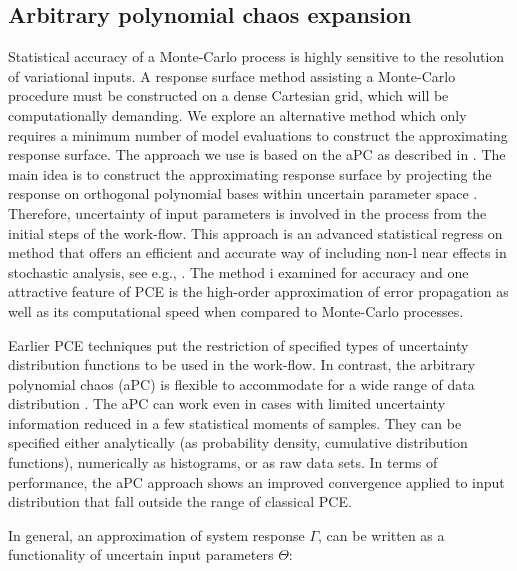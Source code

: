 \subsection{Arbitrary polynomial chaos expansion}

Statistical accuracy of a Monte-Carlo process is highly sensitive to the
resolution of variational inputs. A response surface method assisting a
Monte-Carlo procedure must be constructed on a dense Cartesian grid, which will
be computationally demanding. We explore an alternative method which only
requires a minimum number of model evaluations to construct the approximating
response surface. The approach we use is based on the aPC as described in
\cite{oladyshkin2011concept}. The main idea is to construct the approximating
response surface by projecting the response on orthogonal polynomial bases
within uncertain parameter space . Therefore, uncertainty of input parameters is
involved in the process from the initial steps of the work-flow. This approach
is an advanced statistical regress on method that offers an efficient and
accurate way of including non-l near effects in stochastic analysis, see e.g.,
\cite{Zhang_Lu_2004_JCP,foo_pcm_JCP2010,
Fajraoui_al_2011_WRR}. The method i examined for accuracy and one attractive
feature of PCE is the high-order approximation of error propagation as well as
its computational speed \cite{oladyshkinintegrative} when compared to
Monte-Carlo processes.

Earlier PCE techniques put the restriction of specified types of uncertainty
distribution functions to be used in the work-flow. In contrast, the arbitrary
polynomial chaos (aPC) is flexible to accommodate for a wide range of data
distribution \cite{oladyshkin2011concept}. The aPC can work even in cases with
limited uncertainty information reduced in a few statistical moments of samples.
They can be specified either analytically (as probability density, cumulative
distribution functions), numerically as histograms, or as raw data sets. In
terms of performance, the aPC approach shows an improved convergence applied to
input distribution that fall outside the range of classical PCE.

In general, an approximation of system response $\Gamma$, can be written as a
functionality of uncertain input parameters $\Theta$:

